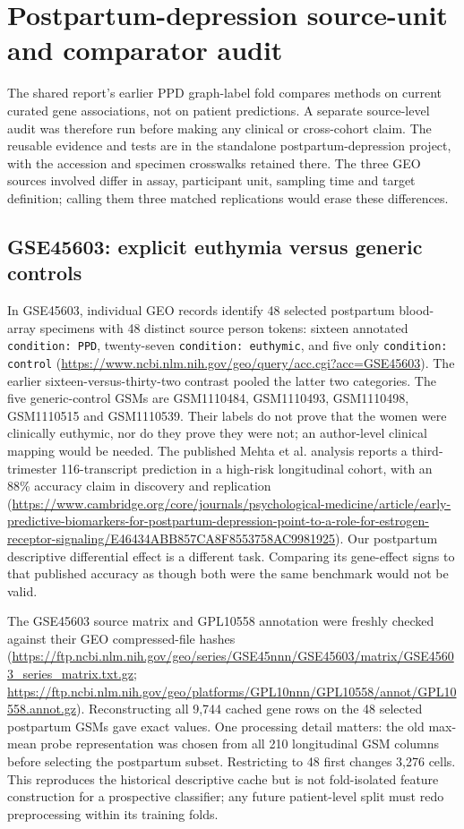 \documentclass[11pt,a4paper]{article}
\begin{document}
\section{Postpartum-depression source-unit and comparator audit}
The shared report's earlier PPD graph-label fold compares methods on current curated gene associations, not on patient predictions. A separate source-level audit was therefore run before making any clinical or cross-cohort claim. The reusable evidence and tests are in the standalone postpartum-depression project, with the accession and specimen crosswalks retained there. The three GEO sources involved differ in assay, participant unit, sampling time and target definition; calling them three matched replications would erase these differences.

\subsection{GSE45603: explicit euthymia versus generic controls}
In GSE45603, individual GEO records identify 48 selected postpartum blood-array specimens with 48 distinct source person tokens: sixteen annotated \texttt{condition: PPD}, twenty-seven \texttt{condition: euthymic}, and five only \texttt{condition: control} (\url{https://www.ncbi.nlm.nih.gov/geo/query/acc.cgi?acc=GSE45603}). The earlier sixteen-versus-thirty-two contrast pooled the latter two categories. The five generic-control GSMs are GSM1110484, GSM1110493, GSM1110498, GSM1110515 and GSM1110539. Their labels do not prove that the women were clinically euthymic, nor do they prove they were not; an author-level clinical mapping would be needed. The published Mehta et al. analysis reports a third-trimester 116-transcript prediction in a high-risk longitudinal cohort, with an 88\% accuracy claim in discovery and replication (\url{https://www.cambridge.org/core/journals/psychological-medicine/article/early-predictive-biomarkers-for-postpartum-depression-point-to-a-role-for-estrogen-receptor-signaling/E46434ABB857CA8F8553758AC9981925}). Our postpartum descriptive differential effect is a different task. Comparing its gene-effect signs to that published accuracy as though both were the same benchmark would not be valid.

The GSE45603 source matrix and GPL10558 annotation were freshly checked against their GEO compressed-file hashes (\url{https://ftp.ncbi.nlm.nih.gov/geo/series/GSE45nnn/GSE45603/matrix/GSE45603_series_matrix.txt.gz}; \url{https://ftp.ncbi.nlm.nih.gov/geo/platforms/GPL10nnn/GPL10558/annot/GPL10558.annot.gz}). Reconstructing all 9,744 cached gene rows on the 48 selected postpartum GSMs gave exact values. One processing detail matters: the old max-mean probe representation was chosen from all 210 longitudinal GSM columns before selecting the postpartum subset. Restricting to 48 first changes 3,276 cells. This reproduces the historical descriptive cache but is not fold-isolated feature construction for a prospective classifier; any future patient-level split must redo preprocessing within its training folds.
\end{document}

